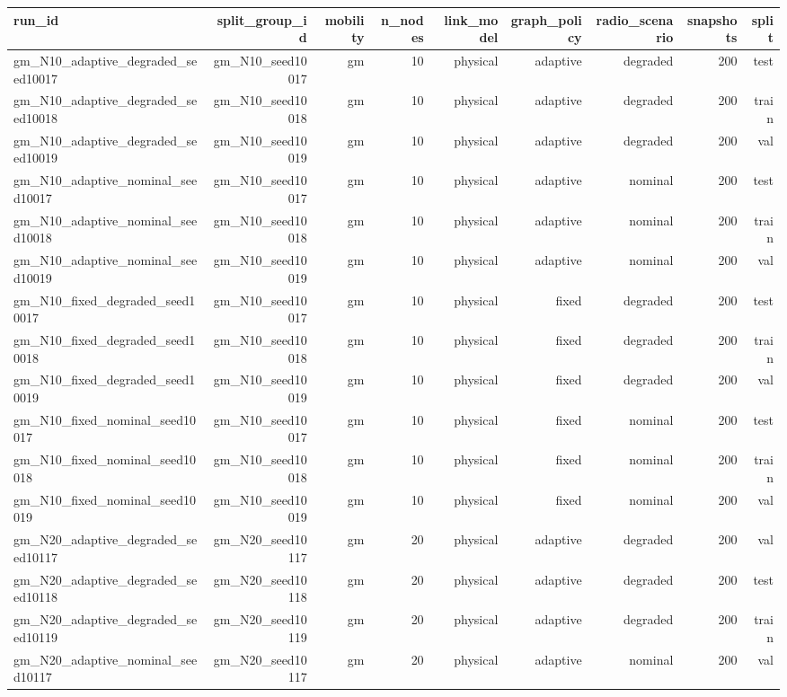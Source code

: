 \begin{tabular}{lrrrrrrrr}
\toprule
run\_id & split\_group\_id & mobility & n\_nodes & link\_model & graph\_policy & radio\_scenario & snapshots & split \\
\midrule
gm\_N10\_adaptive\_degraded\_seed10017 & gm\_N10\_seed10017 & gm & 10 & physical & adaptive & degraded & 200 & test \\
gm\_N10\_adaptive\_degraded\_seed10018 & gm\_N10\_seed10018 & gm & 10 & physical & adaptive & degraded & 200 & train \\
gm\_N10\_adaptive\_degraded\_seed10019 & gm\_N10\_seed10019 & gm & 10 & physical & adaptive & degraded & 200 & val \\
gm\_N10\_adaptive\_nominal\_seed10017 & gm\_N10\_seed10017 & gm & 10 & physical & adaptive & nominal & 200 & test \\
gm\_N10\_adaptive\_nominal\_seed10018 & gm\_N10\_seed10018 & gm & 10 & physical & adaptive & nominal & 200 & train \\
gm\_N10\_adaptive\_nominal\_seed10019 & gm\_N10\_seed10019 & gm & 10 & physical & adaptive & nominal & 200 & val \\
gm\_N10\_fixed\_degraded\_seed10017 & gm\_N10\_seed10017 & gm & 10 & physical & fixed & degraded & 200 & test \\
gm\_N10\_fixed\_degraded\_seed10018 & gm\_N10\_seed10018 & gm & 10 & physical & fixed & degraded & 200 & train \\
gm\_N10\_fixed\_degraded\_seed10019 & gm\_N10\_seed10019 & gm & 10 & physical & fixed & degraded & 200 & val \\
gm\_N10\_fixed\_nominal\_seed10017 & gm\_N10\_seed10017 & gm & 10 & physical & fixed & nominal & 200 & test \\
gm\_N10\_fixed\_nominal\_seed10018 & gm\_N10\_seed10018 & gm & 10 & physical & fixed & nominal & 200 & train \\
gm\_N10\_fixed\_nominal\_seed10019 & gm\_N10\_seed10019 & gm & 10 & physical & fixed & nominal & 200 & val \\
gm\_N20\_adaptive\_degraded\_seed10117 & gm\_N20\_seed10117 & gm & 20 & physical & adaptive & degraded & 200 & val \\
gm\_N20\_adaptive\_degraded\_seed10118 & gm\_N20\_seed10118 & gm & 20 & physical & adaptive & degraded & 200 & test \\
gm\_N20\_adaptive\_degraded\_seed10119 & gm\_N20\_seed10119 & gm & 20 & physical & adaptive & degraded & 200 & train \\
gm\_N20\_adaptive\_nominal\_seed10117 & gm\_N20\_seed10117 & gm & 20 & physical & adaptive & nominal & 200 & val \\

\end{tabular}
